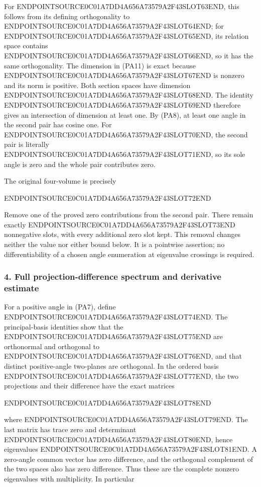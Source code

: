 For ENDPOINTSOURCE0C01A7DD4A656A73579A2F43SLOT63END, this follows from its defining orthogonality to ENDPOINTSOURCE0C01A7DD4A656A73579A2F43SLOT64END; for ENDPOINTSOURCE0C01A7DD4A656A73579A2F43SLOT65END, its relation space contains ENDPOINTSOURCE0C01A7DD4A656A73579A2F43SLOT66END, so it has the same orthogonality. The dimension in (PA11) is exact because ENDPOINTSOURCE0C01A7DD4A656A73579A2F43SLOT67END is nonzero and its norm is positive. Both section spaces have dimension ENDPOINTSOURCE0C01A7DD4A656A73579A2F43SLOT68END. The identity ENDPOINTSOURCE0C01A7DD4A656A73579A2F43SLOT69END therefore gives an intersection of dimension at least one. By (PA8), at least one angle in the second pair has cosine one. For ENDPOINTSOURCE0C01A7DD4A656A73579A2F43SLOT70END, the second pair is literally ENDPOINTSOURCE0C01A7DD4A656A73579A2F43SLOT71END, so its sole angle is zero and the whole pair contributes zero.

The original four-volume is precisely

ENDPOINTSOURCE0C01A7DD4A656A73579A2F43SLOT72END

Remove one of the proved zero contributions from the second pair. There remain exactly ENDPOINTSOURCE0C01A7DD4A656A73579A2F43SLOT73END nonnegative slots, with every additional zero slot kept. This removal changes neither the value nor either bound below. It is a pointwise assertion; no differentiability of a chosen angle enumeration at eigenvalue crossings is required.

\subsubsection{4. Full projection-difference spectrum and derivative estimate}\label{endpoint-principal_angle_volume_review--full-projection-difference-spectrum-and-derivative-estimate}

For a positive angle in (PA7), define ENDPOINTSOURCE0C01A7DD4A656A73579A2F43SLOT74END. The principal-basis identities show that the ENDPOINTSOURCE0C01A7DD4A656A73579A2F43SLOT75END are orthonormal and orthogonal to ENDPOINTSOURCE0C01A7DD4A656A73579A2F43SLOT76END, and that distinct positive-angle two-planes are orthogonal. In the ordered basis ENDPOINTSOURCE0C01A7DD4A656A73579A2F43SLOT77END, the two projections and their difference have the exact matrices

ENDPOINTSOURCE0C01A7DD4A656A73579A2F43SLOT78END

where ENDPOINTSOURCE0C01A7DD4A656A73579A2F43SLOT79END. The last matrix has trace zero and determinant ENDPOINTSOURCE0C01A7DD4A656A73579A2F43SLOT80END, hence eigenvalues ENDPOINTSOURCE0C01A7DD4A656A73579A2F43SLOT81END. A zero-angle common vector has zero difference, and the orthogonal complement of the two spaces also has zero difference. Thus these are the complete nonzero eigenvalues with multiplicity. In particular

